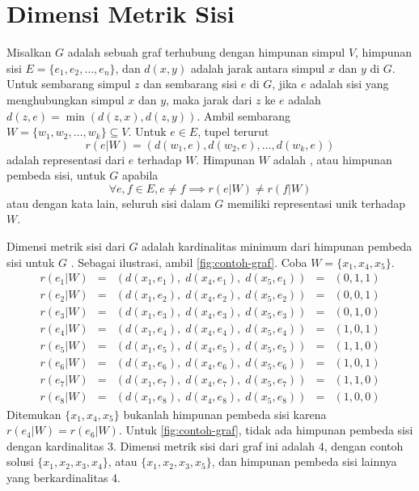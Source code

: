 \section{Dimensi Metrik Sisi}

Misalkan \(G\) adalah sebuah graf terhubung dengan himpunan simpul \(V\), himpunan sisi \(E = \{e_1, e_2, \ldots, e_n\}\), dan \(d(x, y)\) adalah jarak antara simpul \(x\) dan \(y\) di \(G\). Untuk sembarang simpul \(z\) dan sembarang sisi \(e\) di \(G\), jika \(e\) adalah sisi yang menghubungkan simpul \(x\) dan \(y\), maka jarak dari \(z\) ke \(e\) adalah \( d(z, e) = \min(d(z, x), d(z, y)) \). Ambil sembarang \(W = \{w_1, w_2, \ldots, w_k\} \subseteq V\). Untuk \(e \in E\), tupel terurut
	\[ r(e|W) = (d(w_1, e), d(w_2, e), \ldots, d(w_k, e)) \]
adalah representasi dari \(e\) terhadap \(W\). Himpunan \(W\) adalah , atau himpunan pembeda sisi, untuk \(G\) apabila
	\[ \forall e, f \in E, e \neq f \implies r(e|W) \neq r(f|W) \]
atau dengan kata lain, seluruh sisi dalam \(G\) memiliki representasi unik terhadap \(W\).

Dimensi metrik sisi dari \(G\) adalah kardinalitas minimum dari himpunan pembeda sisi untuk \(G\) \citep{kelenc2018}. Sebagai ilustrasi, ambil \autoref{fig:contoh-graf}. Coba \(W = \{x_1, x_4, x_5\}\).
\[
\begin{array}{ccccc}
	r(e_1|W) & = & ( d(x_1, e_1), \; d(x_4, e_1), \; d(x_5, e_1) ) & = & (0, 1, 1) \\
	r(e_2|W) & = & ( d(x_1, e_2), \; d(x_4, e_2), \; d(x_5, e_2) ) & = & (0, 0, 1) \\
	r(e_3|W) & = & ( d(x_1, e_3), \; d(x_4, e_3), \; d(x_5, e_3) ) & = & (0, 1, 0) \\
	r(e_4|W) & = & ( d(x_1, e_4), \; d(x_4, e_4), \; d(x_5, e_4) ) & = & (1, 0, 1) \\
	r(e_5|W) & = & ( d(x_1, e_5), \; d(x_4, e_5), \; d(x_5, e_5) ) & = & (1, 1, 0) \\
	r(e_6|W) & = & ( d(x_1, e_6), \; d(x_4, e_6), \; d(x_5, e_6) ) & = & (1, 0, 1) \\
	r(e_7|W) & = & ( d(x_1, e_7), \; d(x_4, e_7), \; d(x_5, e_7) ) & = & (1, 1, 0) \\
	r(e_8|W) & = & ( d(x_1, e_8), \; d(x_4, e_8), \; d(x_5, e_8) ) & = & (1, 0, 0)
\end{array}
\]
Ditemukan \(\{x_1, x_4, x_5\}\) bukanlah himpunan pembeda sisi karena \(r(e_4|W) = r(e_6|W)\). Untuk \autoref{fig:contoh-graf}, tidak ada himpunan pembeda sisi dengan kardinalitas 3. Dimensi metrik sisi dari graf ini adalah 4, dengan contoh solusi \(\{x_1, x_2, x_3, x_4\}\), atau \(\{x_1, x_2, x_3, x_5\}\), dan himpunan pembeda sisi lainnya yang berkardinalitas 4.

